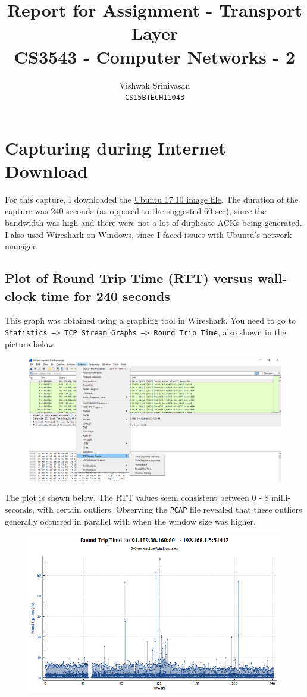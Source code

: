 \documentclass{article}
\title{Report for Assignment - Transport Layer\\
CS3543 - Computer Networks - 2}
\author{Vishwak Srinivasan\\
\texttt{CS15BTECH11043}}
\date{}
\begin{document}
\maketitle 

\section{Capturing during Internet Download}
\begin{flushleft}
For this capture, I downloaded the \href{http://releases.ubuntu.com/17.10/ubuntu-17.10.1-desktop-amd64.iso}{Ubuntu 17.10 image file}. The duration of the capture was 240 seconds (as opposed to the suggested 60 sec), since the bandwidth was high and there were not a lot of duplicate ACKs being generated. I also used Wireshark on Windows, since I faced issues with Ubuntu's network manager.
\end{flushleft}

\subsection{Plot of Round Trip Time (RTT) versus wall-clock time for 240 seconds}
\begin{flushleft}
This graph was obtained using a graphing tool in Wireshark. You need to go to \texttt{Statistics --> TCP Stream Graphs --> Round Trip Time}, also shown in the picture below:
\begin{figure}[H]
\centering
\includegraphics[width=0.6\linewidth]{RTT-Window-size-capture-process.png}
\end{figure}

The plot is shown below. The RTT values seem consistent between 0 - 8 milli-seconds, with certain outliers. Observing the \texttt{PCAP} file revealed that these outliers generally occurred in parallel with when the window size was higher.
\begin{figure}[H]
\centering
\includegraphics[width=0.65\linewidth]{RTT-variation-240-sec-capture-Windows-time.png}
\end{figure}
\end{flushleft}
\end{document}
